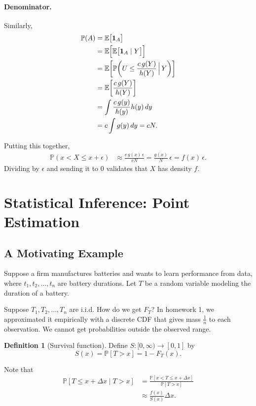 \documentclass{tufte-handout}
\newcommand*\E{\mathbb{E}}
\renewcommand{\P}{\mathbb{P}}
\theoremstyle{definition}
\newtheorem{defn}[thm]{Definition}
\begin{document}
\paragraph{Denominator.}
Similarly,
\begin{align*}
	\P(A)
	&= \E\bigl[ \mathbf 1_A \bigr] \\
	&= \E\Bigl[ \E\bigl[ \mathbf 1_A \mid Y \bigr] \Bigr] \\
	&= \E\biggl[ \P\!\left( U \le \frac{c\,g(Y)}{h(Y)} \,\Big|\, Y \right) \biggr] \\
	&= \E\biggl[ \frac{c\,g(Y)}{h(Y)} \biggr] \\
	&= \int \frac{c\,g(y)}{h(y)} h(y)\,dy \\
	&= c \int g(y)\,dy = cN.
\end{align*}

Putting this together,
\begin{align*}
	\P(x < X \le x+\epsilon)
	&\approx \frac{c\,g(x)\,\epsilon}{cN}
	= \frac{g(x)}{N}\,\epsilon
	= f(x)\,\epsilon.
\end{align*}
Dividing by $\epsilon$ and sending it to $0$ validates that $X$ has density $f$.


\section{Statistical Inference: Point Estimation}

\subsection{A Motivating Example}

Suppose a firm manufactures batteries and wants to learn performance from data, where $t_1,t_2,\ldots,t_n$ are battery durations. Let $T$ be a random variable modeling the duration of a battery.

Suppose $T_1,T_2,\ldots,T_n$ are i.i.d. How do we get $F_T$? In homework 1, we approximated it empirically with a discrete CDF that gives mass $\frac{1}{n}$ to each observation. We cannot get probabilities outside the observed range.

\begin{defn}[Survival function]
	Define $S: [0,\infty) \to [0,1]$ by \[
		S(x) = \P\left[T > x\right] = 1- F_T(x)
	.\] 
\end{defn}

Note that
\begin{align*}
	\P\left[T \le x + \Delta x \mid T > x\right] &= \frac{\P\left[x < T \le x + \Delta x\right] }{\P\left[T > x\right] } \\
												 &\approx \frac{f(x)}{S(x)}\Delta x
.\end{align*} 
\end{document}
